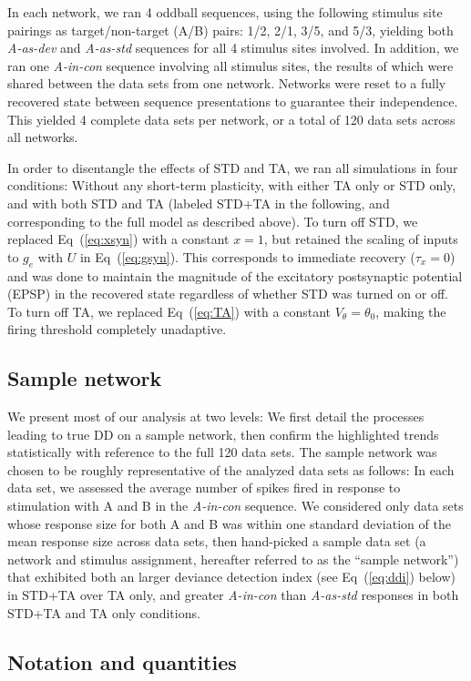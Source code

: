 \documentclass[10pt,letterpaper]{article}
\newcommand{\dev}{\textit{A-as-dev}}
\newcommand{\msc}{\textit{A-in-con}}
\newcommand{\std}{\textit{A-as-std}}
\newcommand{\EQ}[1]{Eq~(\ref{eq:#1})}
\begin{document}
In each network, we ran 4 oddball sequences, using the following stimulus site pairings as target/non-target (A/B) pairs: 1/2, 2/1, 3/5, and 5/3, yielding both \dev{} and \std{} sequences for all 4 stimulus sites involved. In addition, we ran one \msc{} sequence involving all stimulus sites, the results of which were shared between the data sets from one network. Networks were reset to a fully recovered state between sequence presentations to guarantee their independence. This yielded 4 complete data sets per network, or a total of 120 data sets across all networks.

In order to disentangle the effects of STD and TA, we ran all simulations in four conditions: Without any short-term plasticity, with either TA only or STD only, and with both STD and TA (labeled STD+TA in the following, and corresponding to the full model as described above). To turn off STD, we replaced \EQ{xsyn} with a constant $x = 1$, but retained the scaling of inputs to $g_e$ with $U$ in \EQ{gsyn}. This corresponds to immediate recovery ($\tau_x = 0$) and was done to maintain the magnitude of the excitatory postsynaptic potential (EPSP) in the recovered state regardless of whether STD was turned on or off. To turn off TA, we replaced \EQ{TA} with a constant $V_{\theta} = \theta_0$, making the firing threshold completely unadaptive.

\subsection*{Sample network}

We present most of our analysis at two levels: We first detail the processes leading to true DD on a sample network, then confirm the highlighted trends statistically with reference to the full 120 data sets. The sample network was chosen to be roughly representative of the analyzed data sets as follows: In each data set, we assessed the average number of spikes fired in response to stimulation with A and B in the \msc{} sequence. We considered only data sets whose response size for both A and B was within one standard deviation of the mean response size across data sets, then hand-picked a sample data set (a network and stimulus assignment, hereafter referred to as the ``sample network'') that exhibited both an larger deviance detection index (see \EQ{ddi} below) in STD+TA over TA only, and greater \msc{} than \std{} responses in both STD+TA and TA only conditions.

\subsection*{Notation and quantities}
\end{document}
